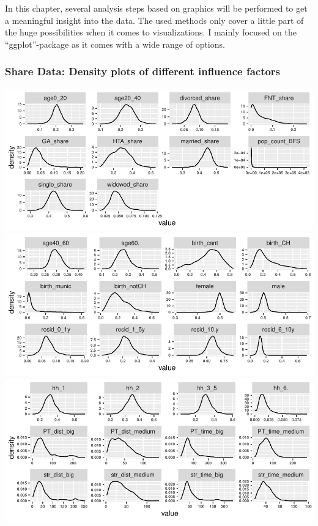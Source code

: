 \documentclass[
]{article}
\begin{document}
In this chapter, several analysis steps based on graphics will be
performed to get a meaningful insight into the data. The used methods
only cover a little part of the huge possibilities when it comes to
visualizations. I mainly focused on the ``ggplot''-package as it comes
with a wide range of options.

\hypertarget{share-data-density-plots-of-different-influence-factors}{%
\subsubsection{Share Data: Density plots of different influence
factors}\label{share-data-density-plots-of-different-influence-factors}}

\includegraphics{Influence_factors_files/figure-latex/1.07_density_plots1-1.pdf}
\includegraphics{Influence_factors_files/figure-latex/1.07_density_plots1-2.pdf}
\includegraphics{Influence_factors_files/figure-latex/1.07_density_plots1-3.pdf}
\end{document}
